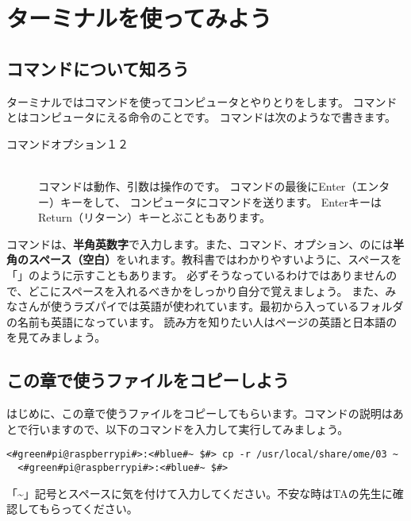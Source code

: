 
\section{ターミナルを使ってみよう}
\subsection{コマンドについて知ろう}

ターミナルではコマンドを使ってコンピュータとやりとりをします。
コマンドとはコンピュータにえる命令のことです。
コマンドは次のようなで書きます。

\begin{description}
\item[コマンド\textvisiblespace オプション\textvisiblespace {}１\textvisiblespace{}２]\mbox{}\\
コマンドは動作、引数は操作のです。
 コマンドの最後にEnter（エンター）キーをして、
 コンピュータにコマンドを送ります。
 EnterキーはReturn（リターン）キーとぶこともあります。
\end{description}

コマンドは、{\bf 半角英数字}で入力します。また、コマンド、オプション、のには{\bf 半角のスペース（空白）}をいれます。教科書ではわかりやすいように、スペースを「\textvisiblespace 」のように示すこともあります。
必ずそうなっているわけではありませんので、どこにスペースを入れるべきかをしっかり自分で覚えましょう。
また、みなさんが使うラズパイでは英語が使われています。最初から入っているフォルダの名前も英語になっています。
読み方を知りたい人は\pageref{英語と日本語の対応表}ページの英語と日本語のを見てみましょう。

\subsection{この章で使うファイルをコピーしよう}
はじめに、この章で使うファイルをコピーしてもらいます。コマンドの説明はあとで行いますので、以下のコマンドを入力して実行してみましょう。
\begin{lstlisting}[caption=使うファイルのコピー,label=workfilecopy]
  <#green#pi@raspberrypi#>:<#blue#~ $#> cp -r /usr/local/share/ome/03 ~
  <#green#pi@raspberrypi#>:<#blue#~ $#>
\end{lstlisting}
「\textasciitilde 」記号とスペースに気を付けて入力してください。不安な時はTAの先生に確認してもらってください。


